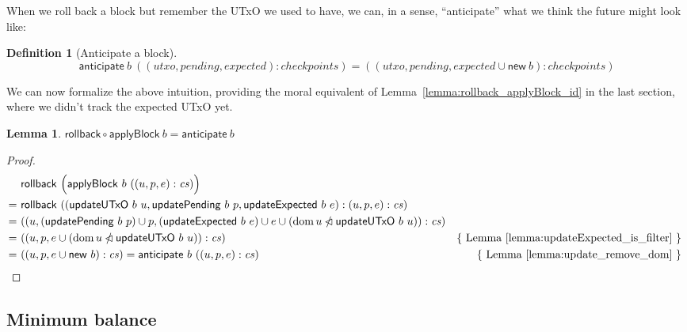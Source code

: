 \documentclass{article}
\newcommand{\restrictdom}{\lhd}
\newcommand{\subtractdom}{\mathbin{\slashed{\restrictdom}}}
\DeclareMathOperator{\dom}{dom}
\newtheorem{lemma}{Lemma}
\newtheorem{definition}{Definition}
\begin{document}
When we roll back a block but remember the UTxO we used to have, we
can, in a sense, ``anticipate'' what we think the future might look like:

\begin{definition}[Anticipate a block]
\begin{equation*}
  \mathsf{anticipate} ~ b ~ ((\mathit{utxo}, \mathit{pending}, \mathit{expected}) : \mathit{checkpoints})
= ((\mathit{utxo}, \mathit{pending}, \mathit{expected} \cup \mathsf{new} ~ b) : \mathit{checkpoints})
\end{equation*}
\end{definition}

We can now formalize the above intuition, providing the moral equivalent
of Lemma~\ref{lemma:rollback_applyBlock_id} in the last section, where we didn't
track the expected UTxO yet.

\begin{lemma}
\begin{math}
  \mathsf{rollback} \circ \mathsf{applyBlock} ~ b = \mathsf{anticipate} ~ b
\end{math}
\end{lemma}

\begin{proof}
\begin{align*}
  & ~ \mathsf{rollback} ~ \Bigl( \mathsf{applyBlock} ~ b ~ ((u, p, e) : \mathit{cs}) \Bigr) \\
= & ~ \mathsf{rollback} ~ ((\mathsf{updateUTxO} ~ b ~ u, \mathsf{updatePending} ~ b ~ p, \mathsf{updateExpected} ~ b ~ e) : (u, p, e) : \mathit{cs}) \\
= & ~ ((u, (\mathsf{updatePending} ~ b ~ p) \cup p,  (\mathsf{updateExpected} ~ b ~ e) \cup e \cup (\dom u \subtractdom \mathsf{updateUTxO} ~ b ~ u)) : \mathit{cs}) \\
= & ~ ((u, p, e \cup (\dom u \subtractdom \mathsf{updateUTxO} ~ b ~ u)) : \mathit{cs}) & \text{\{ Lemma~\ref{lemma:updateExpected_is_filter} \} } \\
= & ~ ((u, p, e \cup \mathsf{new} ~ b) : \mathit{cs}) = \mathsf{anticipate} ~ b ~ ((u, p, e) : \mathit{cs}) & \text{\{ Lemma~\ref{lemma:update_remove_dom} \} }
\end{align*}
\end{proof}

\subsection{Minimum balance}
\end{document}
